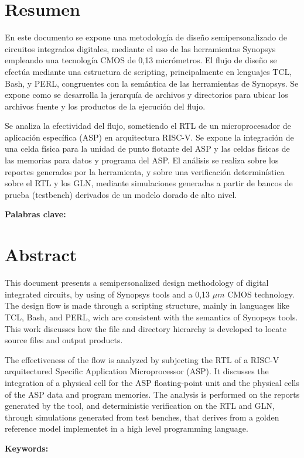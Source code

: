 \chapter*{Resumen}
En este documento se expone una metodología de diseño semipersonalizado de circuitos integrados digitales, mediante el uso de las herramientas Synopsys empleando una tecnología CMOS de 0,13 micrómetros. El flujo de diseño se efectúa mediante una estructura de scripting, principalmente en lenguajes TCL, Bash, y PERL, congruentes con la semántica de las herramientas de Synopsys. Se expone como se desarrolla la jerarquía de archivos y directorios para ubicar los archivos fuente y los productos de la ejecución del flujo.

Se analiza la efectividad del flujo, sometiendo el RTL de un microprocesador de aplicación específica (ASP) en arquitectura RISC-V. Se expone la integración de una celda física para la unidad de punto flotante del ASP y las celdas físicas de las memorias para datos y programa del ASP. El análisis se realiza sobre los reportes generados por la herramienta, y sobre una verificación determinística sobre el RTL y los GLN, mediante simulaciones generadas a partir de bancos de prueba (testbench) derivados de un modelo dorado de alto nivel.


\bigskip

\textbf{Palabras clave:} \scriptKeywords

\clearpage
\chapter*{Abstract}
\thispagestyle{empty}

This document presents a semipersonalized design methodology of digital integrated circuits, by using of Synopsys tools and a 0,13 $\mu m$ CMOS technology. The design flow is made through a scripting structure, mainly in languages like TCL, Bash, and PERL, wich are consistent with the semantics of Synopsys tools. This work discusses how the file and directory hierarchy is developed to locate source files and output products.

The effectiveness of the flow is analyzed by subjecting the RTL of a RISC-V arquitectured Specific Application Microprocessor (ASP). It discusses the integration of a physical cell for the ASP floating-point unit and the physical cells of the ASP data and program memories. The analysis is performed on the reports generated by the tool, and deterministic verification on the RTL and GLN, through simulations generated from test benches, that derives from a golden reference model implementet in a high level programming language.

\bigskip

\textbf{Keywords:} \scriptKeywords 

\cleardoublepage

